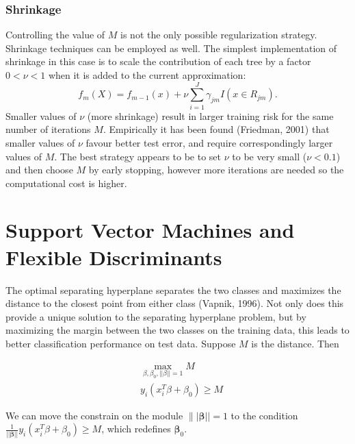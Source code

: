 \documentclass[12pt, letterpaper]{article}
\theoremstyle{definition}
\newcommand{\be}{\mathbf{\beta}}
\begin{document}
\subsubsection{Shrinkage}
Controlling the value of $M$ is not the only possible regularization strategy. Shrinkage techniques can be employed as well. The simplest implementation of shrinkage in this case is to scale the contribution of each tree by a factor $0<\nu<1$ when it is added to the current approximation:
\begin{equation}
f_m(X) = f_{m-1}(x) + \nu \sum_{i=1}^J \gamma_{jm}I(x \in R_{jm}).
\end{equation}
Smaller values of $\nu$ (more shrinkage) result in larger training risk for the same number of iterations $M$. Empirically it has been found (Friedman, 2001) that smaller values of $\nu$ favour better test error, and require correspondingly larger values of $M$. The best strategy appears to be to set $\nu$ to be very small ($\nu < 0.1$) and then choose $M$ by early stopping, however more iterations are needed so the computational cost is higher. 

\newpage
\section{Support Vector Machines and Flexible Discriminants}
The optimal separating hyperplane separates the two classes and maximizes the distance to the closest point from either class (Vapnik, 1996). Not only does this provide a unique solution to the separating hyperplane problem, but by maximizing the margin between the two classes on the training data, this leads to better classification performance on test data.
\iffalse
Suppose $M$ is the distance. Then

\begin{equation}
\begin{aligned}
&\max\limits_{\beta,\beta_0, ||\beta||=1} M \\
& y_i(x_i^T\beta + \beta_0) \ge M
\end{aligned}
\end{equation}

We  can move the constrain on the module $\||\be||=1$ to the condition $\frac{1}{||\be||}y_i(x_i^T\beta + \beta_0) \ge M$, which redefines $\be_0$. 
\end{document}
